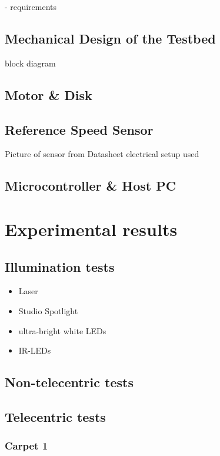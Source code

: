 \documentclass[12pt,a4paper]{article}
\begin{document}
- requirements

\subsection{Mechanical Design of the Testbed}

block diagram

\subsection{Motor \& Disk}

\subsection{Reference Speed Sensor}
      Picture of sensor from Datasheet
      electrical setup used

\subsection{Microcontroller \& Host PC}      

\section{Experimental results}

\subsection{Illumination tests}

\begin{itemize}
  \item Laser
  \item Studio Spotlight
  \item ultra-bright white LEDs
  \item IR-LEDs
\end{itemize}

\subsection{Non-telecentric tests}

\subsection{Telecentric tests}

\subsubsection{Carpet 1}
\end{document}
